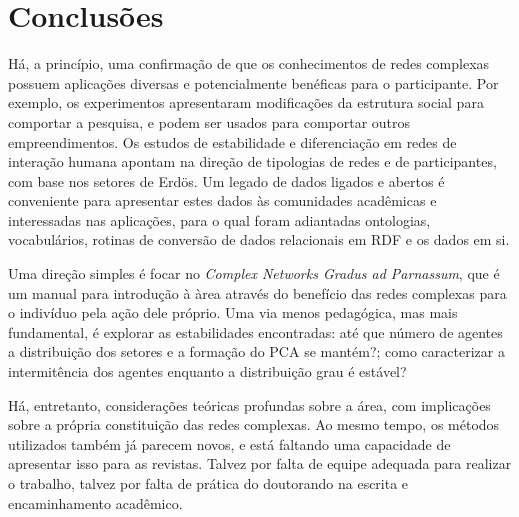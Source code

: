 \documentclass[a4paper,openright,12pt]{report} %
\begin{document}
\chapter{Conclusões}
Há, a princípio, uma confirmação de que os conhecimentos de redes complexas
possuem aplicações diversas e potencialmente benéficas para o participante.
Por exemplo, os experimentos apresentaram modificações da estrutura social para comportar a pesquisa, e podem ser usados para comportar outros empreendimentos. Os estudos de estabilidade e diferenciação em redes de interação humana apontam na direção de tipologias de redes e de participantes, com base nos setores de Erdös.
Um legado de dados ligados e abertos é conveniente para apresentar estes dados às comunidades acadêmicas e interessadas nas aplicações, para o qual foram adiantadas ontologias, vocabulários, rotinas de conversão de dados relacionais em RDF e os dados em si.

Uma direção simples
é focar no \emph{Complex Networks Gradus ad Parnassum},
que é um manual para introdução à àrea através do benefício 
das redes complexas para o indivíduo pela ação dele próprio.
Uma via menos pedagógica, mas mais fundamental, é
explorar as estabilidades encontradas: até que número de
agentes a distribuição dos setores e a formação do PCA se mantém?;
como caracterizar a intermitência dos agentes enquanto a distribuição
grau é estável?

Há, entretanto, considerações teóricas profundas sobre a área,
com implicações sobre a própria constituição das redes complexas.
Ao mesmo tempo, os métodos utilizados também já parecem novos,
e está faltando uma capacidade de apresentar isso para as revistas.
Talvez por falta de equipe adequada para realizar o trabalho,
talvez por falta de prática do doutorando na escrita e encaminhamento
acadêmico.




\end{document}

